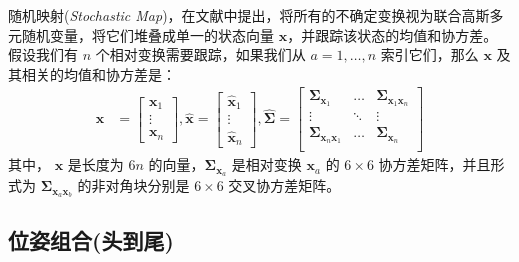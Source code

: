 随机映射(\textit{Stochastic Map})，在文献\cite{smith1990a}中提出，将所有的不确定变换视为联合高斯多元随机变量，将它们堆叠成单一的状态向量 $\mathbf{x}$，并跟踪该状态的均值和协方差。 
假设我们有 $n$ 个相对变换需要跟踪，如果我们从 $a=1, \dots, n$ 索引它们，那么 $\mathbf{x}$ 及其相关的均值和协方差是： 
\begin{align}
\mathbf{x} &= 
    \left[ \begin{array}{c} 
        \mathbf{x}_1 \\ \vdots \\ \mathbf{x}_n \end{array} \right],
\hat{\mathbf{x}} =       
    \left[ \begin{array}{c} 
        \hat{\mathbf{x}}_1 \\ \vdots \\ \hat{\mathbf{x}}_n \end{array} \right], 
\hat{\boldsymbol{\Sigma}} =       
    \left[ \begin{array}{ccc} 
        \boldsymbol{\Sigma}_{\mathbf{x}_1} & \dots & \boldsymbol{\Sigma}_{\mathbf{x}_1 \mathbf{x}_n} \\
        \vdots & \ddots & \vdots \\
        \boldsymbol{\Sigma}_{\mathbf{x}_n \mathbf{x}_1} & \dots  & \boldsymbol{\Sigma}_{\mathbf{x}_n} \\
        \end{array}\right] \label{eq:SSC_joint_rep}
\end{align}
其中， $\mathbf{x}$ 是长度为 $6n$ 的向量，$\boldsymbol{\Sigma}_{\mathbf{x}_a}$ 是相对变换 $\mathbf{x}_a$ 的 $6\times6$ 协方差矩阵，并且形式为 $\boldsymbol{\Sigma}_{\mathbf{x}_a \mathbf{x}_b}$ 的非对角块分别是 $6\times6$ 交叉协方差矩阵。 

\subsection{位姿组合(头到尾)}
\label{sec:SSC:head-to-tail}

